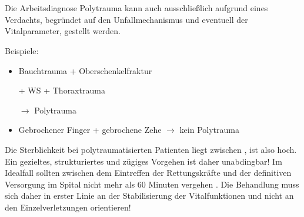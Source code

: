 

\clearpage %
\section{}
\label{topic:polytrauma}

\Text{\TxBeschreibung}
{%
%
Die Arbeitsdiagnose Polytrauma kann auch ausschließlich
aufgrund eines Verdachts, begründet auf den Unfallmechanismus und eventuell der Vitalparameter,
gestellt werden.

\noindent Beispiele:
\begin{itemize}
  \item Bauchtrauma + Oberschenkelfraktur 
  
   + WS + Thoraxtrauma 
  
  ${\rightarrow}$ Polytrauma
  \item Gebrochener Finger + gebrochene Zehe ${\rightarrow}$ kein
  Polytrauma
\end{itemize}




Die Sterblichkeit bei polytraumatisierten Patienten liegt
zwischen \PC*, ist also hoch. Ein gezieltes,
strukturiertes und zügiges Vorgehen ist daher unabdingbar!
Im Idealfall sollten zwischen dem Eintreffen der
Rettungskräfte und der definitiven Versorgung im Spital
nicht mehr als 60 Minuten vergehen \cite{BoehmerTaschRett6}.
Die Behandlung muss sich daher in erster Linie an der
Stabilisierung der Vitalfunktionen und nicht an den
Einzelverletzungen orientieren!
}

\begin{Synopsis}
\end{Synopsis}

